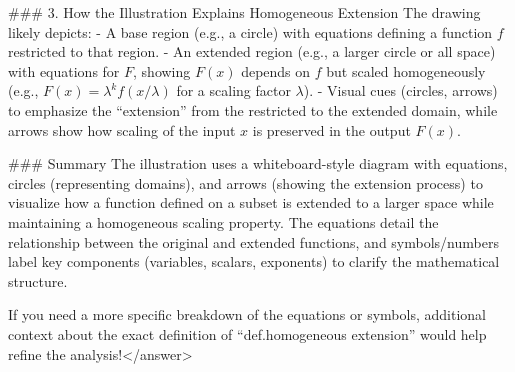### 3. How the Illustration Explains Homogeneous Extension  
The drawing likely depicts:  
- A base region (e.g., a circle) with equations defining a function \( f \) restricted to that region.  
- An extended region (e.g., a larger circle or all space) with equations for \( F \), showing \( F(x) \) depends on \( f \) but scaled homogeneously (e.g., \( F(x) = \lambda^k f(x/\lambda) \) for a scaling factor \( \lambda \)).  
- Visual cues (circles, arrows) to emphasize the “extension” from the restricted to the extended domain, while arrows show how scaling of the input \( x \) is preserved in the output \( F(x) \).  


### Summary  
The illustration uses a whiteboard-style diagram with equations, circles (representing domains), and arrows (showing the extension process) to visualize how a function defined on a subset is extended to a larger space while maintaining a homogeneous scaling property. The equations detail the relationship between the original and extended functions, and symbols/numbers label key components (variables, scalars, exponents) to clarify the mathematical structure.  

If you need a more specific breakdown of the equations or symbols, additional context about the exact definition of “def.homogeneous extension” would help refine the analysis!</answer>